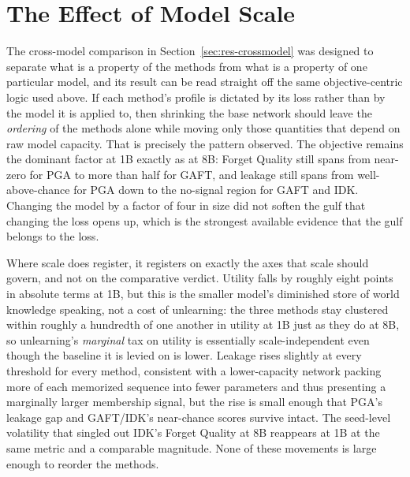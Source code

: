 \documentclass[a4paper,12pt]{report}
\begin{document}
\section{The Effect of Model Scale}
\label{sec:disc-scale}
The cross-model comparison in Section~\ref{sec:res-crossmodel} was designed to separate what is a property of the methods from what is a property of one particular model, and its result can be read straight off the same objective-centric logic used above. If each method's profile is dictated by its loss rather than by the model it is applied to, then shrinking the base network should leave the \emph{ordering} of the methods alone while moving only those quantities that depend on raw model capacity. That is precisely the pattern observed. The objective remains the dominant factor at 1B exactly as at 8B: Forget Quality still spans from near-zero for PGA to more than half for GAFT, and leakage still spans from well-above-chance for PGA down to the no-signal region for GAFT and IDK. Changing the model by a factor of four in size did not soften the gulf that changing the loss opens up, which is the strongest available evidence that the gulf belongs to the loss.

Where scale does register, it registers on exactly the axes that scale should govern, and not on the comparative verdict. Utility falls by roughly eight points in absolute terms at 1B, but this is the smaller model's diminished store of world knowledge speaking, not a cost of unlearning: the three methods stay clustered within roughly a hundredth of one another in utility at 1B just as they do at 8B, so unlearning's \emph{marginal} tax on utility is essentially scale-independent even though the baseline it is levied on is lower. Leakage rises slightly at every threshold for every method, consistent with a lower-capacity network packing more of each memorized sequence into fewer parameters and thus presenting a marginally larger membership signal, but the rise is small enough that PGA's leakage gap and GAFT/IDK's near-chance scores survive intact. The seed-level volatility that singled out IDK's Forget Quality at 8B reappears at 1B at the same metric and a comparable magnitude. None of these movements is large enough to reorder the methods.
\end{document}
